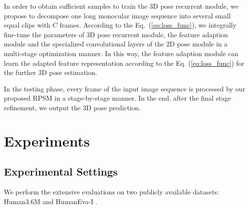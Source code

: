 \documentclass[10pt,twocolumn,letterpaper]{article}
\begin{document}
In order to obtain sufficient samples to train the 3D pose recurrent module, we propose to decompose one long monocular image sequence into several small equal clips with $C$ frames. According to the Eq.~(\ref{eq:loss_func}), we integrally fine-tune the parameters of 3D pose recurrent module, the feature adaption module and the specialized convolutional layers of the 2D pose module in a multi-stage optimization manner. In this way, the feature adaption module can learn the adapted feature representation according to the Eq. (\ref{eq:loss_func}) for the further 3D pose estimation.

In the testing phase, every frame of the input image sequence is processed by our proposed RPSM in a stage-by-stage manner. In the end, after the final stage refinement, we output the 3D pose prediction. 




\section{Experiments}
\subsection{Experimental Settings}
We perform the extensive evaluations on two publicly available datasets: Human3.6M \cite{huamn3.6m} and HumanEva-I \cite{sigal2010humaneva}. 
\end{document}
